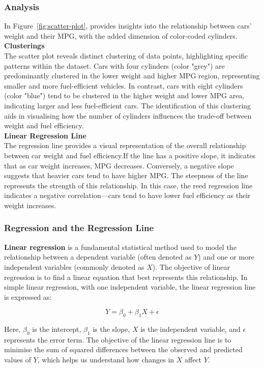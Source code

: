 \documentclass{article}\usepackage[]{graphicx}\usepackage[]{xcolor}
\begin{document}
\subsubsection{Analysis}
In Figure~\ref{fig:scatter-plot}, provides insights into the relationship between cars' weight and their MPG, with the added dimension of color-coded cylinders.\\

\textbf{Clusterings}\\
The scatter plot reveals distinct clustering of data points, highlighting specific patterns within the dataset. Cars with four cylinders (color "grey") are predominantly clustered in the lower weight and higher MPG region, representing smaller and more fuel-efficient vehicles. In contrast, cars with eight cylinders (color "blue") tend to be clustered in the higher weight and lower MPG area, indicating larger and less fuel-efficient cars. The identification of this clustering aids in visualising how the number of cylinders influences the trade-off between weight and fuel efficiency.\\

\textbf{Linear Regression Line}\\
The regression line provides a visual representation of the overall relationship between car weight and fuel efficiency.If the line has a positive slope, it indicates that as car weight increases, MPG decreases. Conversely, a negative slope suggests that heavier cars tend to have higher MPG. The steepness of the line represents the strength of this relationship. In this case, the reed regression line indicates a negative correlation—cars tend to have lower fuel efficiency as their weight increases.

\subsubsection{Regression and the Regression Line}
\textbf{Linear regression} is a fundamental statistical method used to model the relationship between a dependent variable (often denoted as \(Y\)) and one or more independent variables (commonly denoted as \(X\)). The objective of linear regression is to find a linear equation that best represents this relationship. In simple linear regression, with one independent variable, the linear regression line is expressed as:

\[
Y = \beta_0 + \beta_1X + \epsilon
\]

Here, \(\beta_0\) is the intercept, \(\beta_1\) is the slope, \(X\) is the independent variable, and \(\epsilon\) represents the error term. The objective of the linear regression line is to minimise the sum of squared differences between the observed and predicted values of \(Y\), which helps us understand how changes in \(X\) affect \(Y\). 
\end{document}
